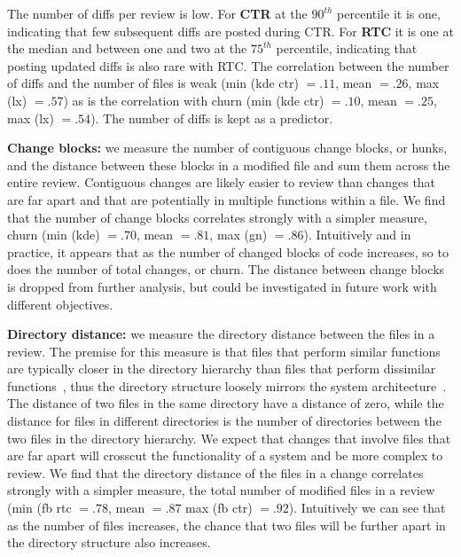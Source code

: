The number of diffs per review is low. For {\bf CTR} at the $90^{th}$
percentile it is one, indicating that few subsequent diffs are posted during
CTR. For {\bf RTC} it is one at the median and between one and two at the
$75^{th}$ percentile, indicating that posting updated diffs is also rare with
RTC. The correlation between the number of diffs and the number of files is
weak (min (kde ctr) $=.11$, mean $= .26$, max (lx) $= .57$) as is the
correlation with churn (min (kde ctr) $= .10$, mean $= .25$, max (lx) $= .54$).
The number of diffs is kept as a predictor.

{\bf Change blocks:} we measure the number of contiguous change blocks, or
hunks, and the distance between these blocks in a modified file and sum them
across the entire review.  Contiguous changes  are likely easier to review than
changes that are far apart and that are potentially in multiple functions
within a file.  
%
We find that the number of change blocks correlates strongly with a simpler
measure, churn (min (kde) $= .70$, mean $= .81$, max (gn) $= .86$).
Intuitively and in practice, it appears that as the number of changed blocks of
code increases, so to does the number of total changes, or churn. The distance
between change blocks is dropped from further analysis, but could be
investigated in future work with different objectives.

%
{\bf Directory distance:} we measure the directory distance between the files
in a review. The premise for this measure is that files that perform similar
functions are typically closer in the directory hierarchy than files that
perform dissimilar functions~\cite{Bowman1999ICSE}, thus the directory
structure loosely mirrors the system architecture~\cite{RigbySubTOSEM}. The
distance of two files in the same directory have a distance of zero, while the
distance for files in different directories is the number of directories
between the two files in the directory hierarchy.  We expect that changes that
involve files that are far apart will crosscut the functionality of a system
and be more complex to review.
%
We find that the directory distance of the files in a change correlates
strongly with a simpler measure, the total number of modified files in a review
(min (fb rtc $= .78$, mean $= .87$ max (fb ctr) $= .92$).  Intuitively we can
see that as the number of files increases, the chance that two files will be
further apart in the directory structure also increases.  


